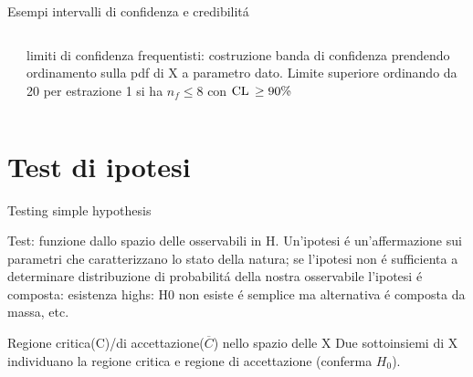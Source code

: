 \begin{wordonframe}{Esempi intervalli di confidenza e credibilit\'a}
\begin{columns}[T]
\begin{column}{0.3\textwidth}
\end{column}
	\begin{column}{0.7\textwidth}
limiti di confidenza frequentisti: costruzione banda di confidenza prendendo ordinamento sulla pdf di X a parametro dato. Limite superiore ordinando da 20 per estrazione 1 si ha $n_f\leq8$ con $\operatorname{CL}{}\geq90\%$
\end{column}
\end{columns}
\end{wordonframe}

\section{Test di ipotesi}

\begin{frame}{Testing simple hypothesis}

\begin{block}{Test: funzione dallo spazio delle osservabili in H.}
Un'ipotesi \'e un'affermazione sui parametri che caratterizzano lo stato della natura; se l'ipotesi non \'e sufficienta a determinare distribuzione di probabilit\'a della nostra osservabile l'ipotesi \'e composta: esistenza highs: H0 non esiste \'e semplice ma alternativa \'e composta da massa, etc.
\end{block}

\begin{block}{Regione critica(C)/di accettazione($\overline{C}$) nello spazio delle X}
Due sottoinsiemi di X individuano la regione critica e regione di accettazione (conferma $H_0$).
\end{block}

\end{frame}

